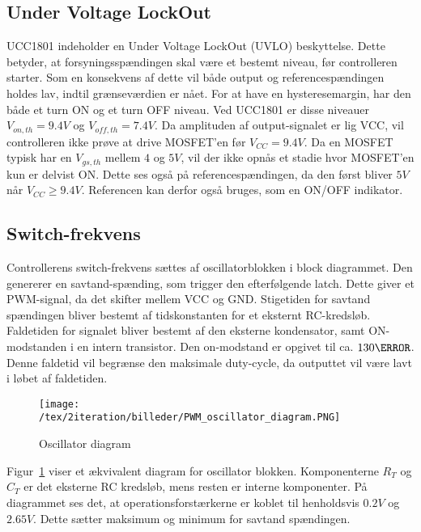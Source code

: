 \subsection{Under Voltage LockOut}
UCC1801 indeholder en Under Voltage LockOut (UVLO) beskyttelse. Dette betyder, at forsyningsspændingen skal være et bestemt niveau, før controlleren starter. Som en konsekvens af dette vil både output og referencespændingen holdes lav, indtil grænseværdien er nået. For at have en hysteresemargin, har den både et turn ON og et turn OFF niveau. Ved UCC1801 er disse niveauer $V_{on,th}=9.4V$ og $V_{off,th}=7.4V$. Da amplituden af output-signalet er lig VCC, vil controlleren ikke prøve at drive MOSFET'en før $V_{CC}=9.4V$. Da en MOSFET typisk har en $V_{gs,th}$ mellem $4$ og $5V$, vil der ikke opnås et stadie hvor MOSFET'en kun er delvist ON. Dette ses også på referencespændingen, da den først bliver $5V$ når $V_{CC}\geqslant 9.4V$. Referencen kan derfor også bruges, som en ON/OFF indikator. 

\subsection{Switch-frekvens}
Controllerens switch-frekvens sættes af oscillatorblokken i block diagrammet. Den genererer en savtand-spænding, som trigger den efterfølgende latch. Dette giver et PWM-signal, da det skifter mellem VCC og GND.
Stigetiden for savtand spændingen bliver bestemt af tidskonstanten for et eksternt RC-kredsløb. Faldetiden for signalet bliver bestemt af den eksterne kondensator, samt ON-modstanden i en intern transistor. Den on-modstand er opgivet til ca. $130\ohm$. Denne faldetid vil begrænse den maksimale duty-cycle, da outputtet vil være lavt i løbet af faldetiden. 

\begin{figure}[H]
	\center
	\texttt{[image: /tex/2iteration/billeder/PWM\_oscillator\_diagram.PNG]}
	\caption{Oscillator diagram}
	\label{fig:PWM_oscillator_diagram}
\end{figure}

Figur~\ref{fig:PWM_oscillator_diagram} viser et ækvivalent diagram for oscillator blokken. Komponenterne $R_T$ og $C_T$ er det eksterne RC kredsløb, mens resten er interne komponenter. På diagrammet ses det, at operationsforstærkerne er koblet til henholdsvis $0.2V$ og $2.65V$. Dette sætter maksimum og minimum for savtand spændingen. 


